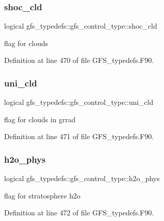 \subsubsection{shoc\+\_\+cld}
{\footnotesize\ttfamily logical gfs\+\_\+typedefs\+::gfs\+\_\+control\+\_\+type\+::shoc\+\_\+cld}



flag for clouds 



Definition at line 470 of file G\+F\+S\+\_\+typedefs.\+F90.

\mbox{\label{structgfs__typedefs_1_1gfs__control__type_ad028e557f291a66d67770146dbd0be63}} 
\subsubsection{uni\+\_\+cld}
{\footnotesize\ttfamily logical gfs\+\_\+typedefs\+::gfs\+\_\+control\+\_\+type\+::uni\+\_\+cld}



flag for clouds in grrad 



Definition at line 471 of file G\+F\+S\+\_\+typedefs.\+F90.

\mbox{\label{structgfs__typedefs_1_1gfs__control__type_a85670082147ee5b0632133f753e0f493}} 
\subsubsection{h2o\+\_\+phys}
{\footnotesize\ttfamily logical gfs\+\_\+typedefs\+::gfs\+\_\+control\+\_\+type\+::h2o\+\_\+phys}



flag for stratosphere h2o 



Definition at line 472 of file G\+F\+S\+\_\+typedefs.\+F90.

\mbox{\label{structgfs__typedefs_1_1gfs__control__type_a17cedeaa1c21eacf1106da655768f0ec}} 
